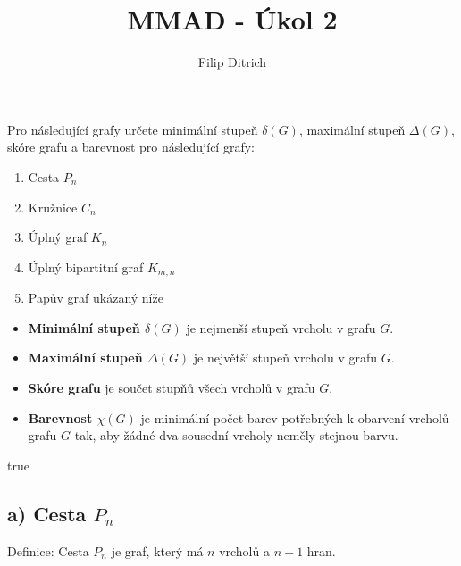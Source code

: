 \documentclass[10pt, a4paper]{ReportSheet}
\begin{document}
    \title{MMAD - Úkol 2}
    \author{Filip Ditrich}
    \date{
        \footnotesize{
        }
    }
    \maketitle

    \setcounter{tocdepth}{1}
    \pagestyle{plain}
    \renewcommand{\contentsname}{}
    \tableofcontents

    \begin{uloha}{1}{2}{
        Pro následující grafy určete minimální stupeň $\delta(G)$, maximální stupeň $\Delta(G)$, skóre grafu a barevnost pro následující grafy:
        \begin{enumerate}
            \renewcommand{\theenumi}{\alph{enumi}}
            \item Cesta $P_n$
            \item Kružnice $C_n$
            \item Úplný graf $K_n$
            \item Úplný bipartitní graf $K_{m,n}$
            \item Papův graf ukázaný níže
        \end{enumerate}

        \begin{itemize}
            \itemsep0.5em
            \item \textbf{Minimální stupeň $\delta(G)$} je nejmenší stupeň vrcholu v grafu $G$.
            \item \textbf{Maximální stupeň $\Delta(G)$} je největší stupeň vrcholu v grafu $G$.
            \item \textbf{Skóre grafu} je součet stupňů všech vrcholů v grafu $G$.
            \item \textbf{Barevnost $\chi(G)$} je minimální počet barev potřebných k obarvení vrcholů grafu $G$ tak,
            aby žádné dva sousední vrcholy neměly stejnou barvu.
        \end{itemize}
    }{true}

        \subsection{a) Cesta $P_n$}
        \label{subsec:ukol-2-1a-cesta}
        Definice: Cesta $P_n$ je graf, který má $n$ vrcholů a $n-1$ hran.


\end{uloha}
\end{document}
